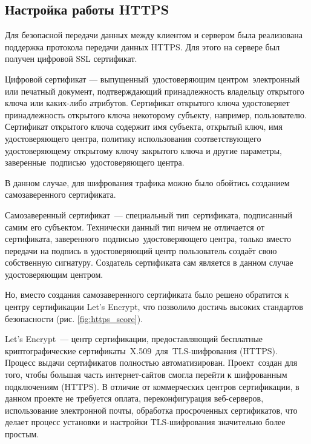 \clearpage
\subsection{Настройка работы HTTPS}
Для безопасной передачи данных между клиентом и сервером была реализована
поддержка протокола передачи данных HTTPS. Для этого на сервере был получен цифровой SSL сертификат.
\begin{definition}
    Цифровой сертификат --- выпущенный удостоверяющим центром электронный или печатный документ,
    подтверждающий принадлежность владельцу открытого ключа или каких-либо атрибутов.
    Сертификат открытого ключа удостоверяет принадлежность открытого ключа некоторому субъекту, например, пользователю.
    Сертификат открытого ключа содержит имя субъекта, открытый ключ, имя удостоверяющего центра,
    политику использования соответствующего удостоверяющему открытому ключу закрытого ключа и другие параметры, заверенные подписью удостоверяющего центра.
\end{definition}

В данном случае, для шифрования трафика можно было обойтись созданием самозаверенного сертификата.
\begin{definition}
    Самозаверенный сертификат --- специальный тип сертификата, подписанный самим его субъектом. Технически данный тип ничем не отличается от сертификата,
    заверенного подписью удостоверяющего центра, только вместо передачи на подпись в удостоверяющий центр пользователь создаёт свою собственную сигнатуру.
    Создатель сертификата сам является в данном случае удостоверяющим центром.
\end{definition}

Но, вместо создания самозаверенного сертификата было решено обратится к центру сертификации Let’s Encrypt,
что позволило достичь высоких стандартов безопасности (рис. \ref{fig:https_score}).
\begin{definition}
    Let’s Encrypt --- центр сертификации, предоставляющий бесплатные криптографические сертификаты X.509 для TLS-шифрования (HTTPS).
    Процесс выдачи сертификатов полностью автоматизирован. Проект создан для того,
    чтобы большая часть интернет-сайтов смогла перейти к шифрованным подключениям (HTTPS). В отличие от коммерческих центров сертификации,
    в данном проекте не требуется оплата, переконфигурация веб-серверов, использование электронной почты,
    обработка просроченных сертификатов, что делает процесс установки и настройки TLS-шифрования значительно более простым.
\end{definition}

